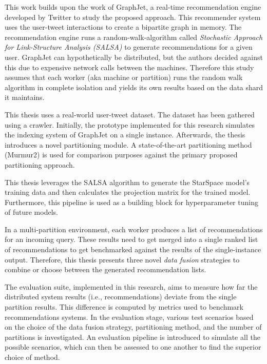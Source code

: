 This work builds upon the work of GraphJet, a real-time recommendation engine developed by Twitter to study the proposed approach. This recommender system uses the user-tweet interactions to create a bipartite graph in memory. The recommendation engine runs a random-walk-algorithm called \emph{Stochastic Approach for Link-Structure Analysis (SALSA)} to generate recommendations for a given user. GraphJet can hypothetically be distributed, but the authors decided against this due to expensive network calls between the machines. Therefore this study assumes that each worker (aka machine or partition) runs the random walk algorithm in complete isolation and yields its own results based on the data shard it maintains. 


This thesis uses a real-world user-tweet dataset. The dataset has been gathered using a crawler. Initially, the prototype implemented for this research simulates the indexing system of GraphJet on a single instance. Afterwards, the thesis introduces a novel partitioning module. A state-of-the-art partitioning method (Murmur2) is used for comparison purposes against the primary proposed partitioning approach.


This thesis leverages the SALSA algorithm to generate the StarSpace model's training data and then calculates the projection matrix for the trained model. Furthermore, this pipeline is used as a building block for hyperparameter tuning of future models. 


In a multi-partition environment, each worker produces a list of recommendations for an incoming query. These results need to get merged into a single ranked list of recommendations to get benchmarked against the results of the single-instance output. Therefore, this thesis presents three novel \emph{data fusion} strategies to combine or choose between the generated recommendation lists.


The evaluation suite, implemented in this research, aims to measure how far the distributed system results (i.e., recommendations) deviate from the single partition results. This difference is computed by metrics used to benchmark recommendations systems. In the evaluation stage, various test scenarios based on the choice of the data fusion strategy, partitioning method, and the number of partitions is investigated. An evaluation pipeline is introduced to simulate all the possible scenarios, which can then be assessed to one another to find the superior choice of method.
 